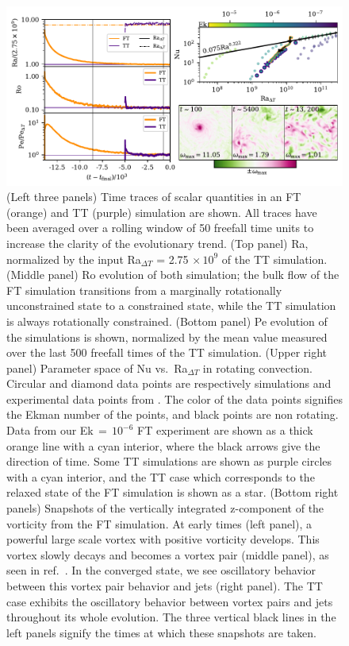 \documentclass[aps, pre, onecolumn, nofootinbib, notitlepage, groupedaddress, amsfonts, amssymb, amsmath, longbibliography, superscriptaddress]{revtex4-1}
\begin{document}
\begin{figure}
\includegraphics[width=\textwidth]{./figs/rotating_panels.pdf}
\caption{ 
	(Left three panels) Time traces of scalar quantities in an FT (orange) and TT (purple) simulation are shown.
	All traces have been averaged over a rolling window of 50 freefall time units to increase the clarity of the evolutionary trend.
	(Top panel) Ra, normalized by the input Ra$_{\Delta T}$ = 2.75$\,\times 10^9$ of the TT simulation.
	(Middle panel) Ro evolution of both simulation; the bulk flow of the FT simulation transitions from a marginally rotationally unconstrained state to a constrained state, while the TT simulation is always rotationally constrained.
	(Bottom panel) Pe evolution of the simulations is shown, normalized by the mean value measured over the last 500 freefall times of the TT simulation.
	(Upper right panel) Parameter space of Nu vs.~Ra$_{\Delta T}$ in rotating convection.
	Circular and diamond data points are respectively simulations and experimental data points from \cite{cheng&all2015}.
	The color of the data points signifies the Ekman number of the points, and black points are non rotating.
	Data from our Ek$\,=\,10^{-6}$ FT experiment are shown as a thick orange line with a cyan interior, where the black arrows give the direction of time.
	Some TT simulations are shown as purple circles with a cyan interior, and the TT case which corresponds to the relaxed state of the FT simulation is shown as a star.
	(Bottom right panels) Snapshots of the vertically integrated z-component of the vorticity from the FT simulation.
	At early times (left panel), a powerful large scale vortex with positive vorticity develops.
	This vortex slowly decays and becomes a vortex pair (middle panel), as seen in ref.~\cite{stellmach&all2014}.
	In the converged state, we see oscillatory behavior between this vortex pair behavior and jets (right panel).
	The TT case exhibits the oscillatory behavior between vortex pairs and jets throughout its whole evolution.
	The three vertical black lines in the left panels signify the times at which these snapshots are taken.
\label{fig:rotating_panels} }
\end{figure}
\end{document}
